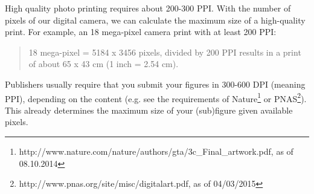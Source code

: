 High quality photo printing requires about 200-300 PPI. With the number of pixels of our digital camera, we can calculate the maximum size of a high-quality print. For example, an 18 mega-pixel camera print with at least 200 PPI: 

\begin{quotation}
	18 mega-pixel = 5184 x 3456 pixels, divided by 200 PPI results in a print of about 65 x 43 cm (1 inch = 2.54 cm).
\end{quotation}

Publishers usually require that you submit your figures in 300-600 DPI (meaning PPI), depending on the content (e.g. see the requirements of Nature\footnote{http://www.nature.com/nature/authors/gta/3c\_Final\_artwork.pdf, as of 08.10.2014} or PNAS\footnote{http://www.pnas.org/site/misc/digitalart.pdf, as of 04/03/2015}). This already determines the maximum size of your (sub)figure given available pixels. 

